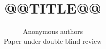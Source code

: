 \documentclass{article}
\title{@@TITLE@@}
\author{Anonymous authors\\Paper under double-blind review}
\begin{document}
\maketitle

\begin{abstract}

\end{abstract}










\appendix

\end{document}

